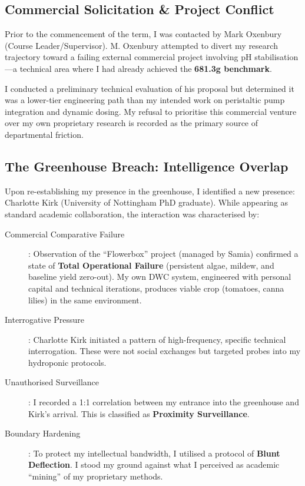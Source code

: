 \documentclass{EMBASSY}
\begin{document}
\subsection{Commercial Solicitation \& Project Conflict}
Prior to the commencement of the term, I was contacted by Mark Oxenbury (Course Leader/Supervisor). M. Oxenbury attempted to divert my research trajectory toward a failing external commercial project involving pH stabilisation---a technical area where I had already achieved the \textbf{681.3g benchmark}.

I conducted a preliminary technical evaluation of his proposal but determined it was a lower-tier engineering path than my intended work on peristaltic pump integration and dynamic dosing. My refusal to prioritise this commercial venture over my own proprietary research is recorded as the primary source of departmental friction.

\subsection{The Greenhouse Breach: Intelligence Overlap}
Upon re-establishing my presence in the greenhouse, I identified a new presence: Charlotte Kirk (University of Nottingham PhD graduate). While appearing as standard academic collaboration, the interaction was characterised by:

\begin{description}
	\item[Commercial Comparative Failure]: Observation of the ``Flowerbox'' project (managed by Samia) confirmed a state of \textbf{Total Operational Failure} (persistent algae, mildew, and baseline yield zero-out). My own DWC system, engineered with personal capital and technical iterations, produces viable crop (tomatoes, canna lilies) in the same environment.
	\item[Interrogative Pressure]: Charlotte Kirk initiated a pattern of high-frequency, specific technical interrogation. These were not social exchanges but targeted probes into my hydroponic protocols.
	\item[Unauthorised Surveillance]: I recorded a 1:1 correlation between my entrance into the greenhouse and Kirk’s arrival. This is classified as \textbf{Proximity Surveillance}.
	\item[Boundary Hardening]: To protect my intellectual bandwidth, I utilised a protocol of \textbf{Blunt Deflection}. I stood my ground against what I perceived as academic ``mining'' of my proprietary methods.
\end{description}
\end{document}
